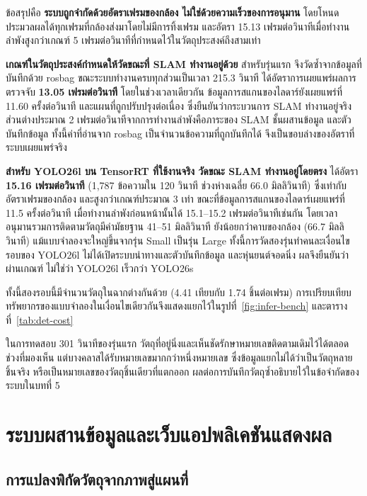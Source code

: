 \documentclass[a4paper,12pt]{report}
\begin{document}
ข้อสรุปคือ \textbf{ระบบถูกจำกัดด้วยอัตราเฟรมของกล้อง ไม่ใช่ด้วยความเร็วของการอนุมาน}
โดยโหนดประมวลผลได้ทุกเฟรมที่กล้องส่งมาโดยไม่มีการทิ้งเฟรม
และอัตรา 15.13 เฟรมต่อวินาทีเมื่อทำงานลำพังสูงกว่าเกณฑ์ 5 เฟรมต่อวินาทีที่กำหนดไว้ในวัตถุประสงค์ถึงสามเท่า

\textbf{เกณฑ์ในวัตถุประสงค์กำหนดให้วัดขณะที่ SLAM ทำงานอยู่ด้วย}
สำหรับรุ่นแรก จึงวัดซ้ำจากข้อมูลที่บันทึกด้วย rosbag ขณะระบบทำงานครบทุกส่วนเป็นเวลา 215.3 วินาที
ได้อัตราการเผยแพร่ผลการตรวจจับ \textbf{13.05 เฟรมต่อวินาที}
โดยในช่วงเวลาเดียวกัน ข้อมูลการสแกนของไลดาร์ยังเผยแพร่ที่ 11.60 ครั้งต่อวินาที
และแผนที่ถูกปรับปรุงต่อเนื่อง ซึ่งยืนยันว่ากระบวนการ SLAM ทำงานอยู่จริง
ส่วนต่างประมาณ 2 เฟรมต่อวินาทีจากการทำงานลำพังคือภาระของ SLAM ชั้นผสานข้อมูล และตัวบันทึกข้อมูล
ทั้งนี้ค่าที่อ่านจาก rosbag เป็นจำนวนข้อความที่ถูกบันทึกได้
จึงเป็นขอบล่างของอัตราที่ระบบเผยแพร่จริง

\textbf{สำหรับ YOLO26l บน TensorRT ที่ใช้งานจริง วัดขณะ SLAM ทำงานอยู่โดยตรง}
ได้อัตรา \textbf{15.16 เฟรมต่อวินาที} (1{,}787 ข้อความใน 120 วินาที ช่วงห่างเฉลี่ย 66.0 มิลลิวินาที)
ซึ่งเท่ากับอัตราเฟรมของกล้อง และสูงกว่าเกณฑ์ประมาณ 3 เท่า
ขณะที่ข้อมูลการสแกนของไลดาร์เผยแพร่ที่ 11.5 ครั้งต่อวินาที
เมื่อทำงานลำพังก่อนหน้านั้นได้ 15.1--15.2 เฟรมต่อวินาทีเช่นกัน
โดยเวลาอนุมานรวมการติดตามวัตถุมีค่ามัธยฐาน 41--51 มิลลิวินาที ยังน้อยกว่าคาบของกล้อง (66.7 มิลลิวินาที)
แม้แบบจำลองจะใหญ่ขึ้นจากรุ่น Small เป็นรุ่น Large
ทั้งนี้การวัดสองรุ่นทำคนละเงื่อนไข รอบของ YOLO26l ไม่ได้เปิดระบบนำทางและตัวบันทึกข้อมูล
และหุ่นยนต์จอดนิ่ง ผลจึงยืนยันว่าผ่านเกณฑ์ ไม่ใช่ว่า YOLO26l เร็วกว่า YOLO26s

ทั้งนี้สองรอบนี้มีจำนวนวัตถุในฉากต่างกันด้วย (4.41 เทียบกับ 1.74 ชิ้นต่อเฟรม)
การเปรียบเทียบทรัพยากรของแบบจำลองในเงื่อนไขเดียวกันจึงแสดงแยกไว้ในรูปที่~\ref{fig:infer-bench}
และตารางที่~\ref{tab:det-cost}

ในการทดสอบ 301 วินาทีของรุ่นแรก วัตถุที่อยู่นิ่งและเห็นชัดรักษาหมายเลขติดตามเดิมไว้ได้ตลอดช่วงที่มองเห็น
แต่บางคลาสได้รับหมายเลขมากกว่าหนึ่งหมายเลข ซึ่งข้อมูลแยกไม่ได้ว่าเป็นวัตถุหลายชิ้นจริง
หรือเป็นหมายเลขของวัตถุชิ้นเดียวที่แตกออก ผลต่อการบันทึกวัตถุซ้ำอธิบายไว้ในข้อจำกัดของระบบในบทที่ 5


\section{ระบบผสานข้อมูลและเว็บแอปพลิเคชันแสดงผล}

\subsection{การแปลงพิกัดวัตถุจากภาพสู่แผนที่}
\end{document}
